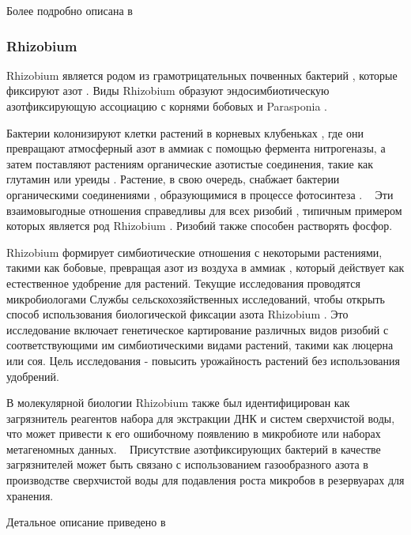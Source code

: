 \documentclass[11pt]{article}
\begin{document}
	Более подробно описана в ~\cite{Pasteurella_1,Pasteurella_2,Pasteurella_3,Pasteurella_4,Pasteurella_5,Pasteurella_6,Pasteurella_7,Pasteurella_8,Pasteurella_9,Pasteurella_10,Pasteurella_11,Pasteurella_12,Pasteurella_13,Pasteurella_14,Pasteurella_15,Pasteurella_16}
	
	\subsubsection{Rhizobium}
	Rhizobium является родом из грамотрицательных почвенных бактерий , которые фиксируют азот . Виды Rhizobium образуют эндосимбиотическую азотфиксирующую ассоциацию с корнями бобовых и Parasponia .
	
	Бактерии колонизируют клетки растений в корневых клубеньках , где они превращают атмосферный азот в аммиак с помощью фермента нитрогеназы, а затем поставляют растениям органические азотистые соединения, такие как глутамин или уреиды . Растение, в свою очередь, снабжает бактерии органическими соединениями , образующимися в процессе фотосинтеза . ~\cite{Rhizobium_2} Эти взаимовыгодные отношения справедливы для всех ризобий , типичным примером которых является род Rhizobium . Ризобий также способен растворять фосфор. ~\cite{Rhizobium_3}
	
	Rhizobium формирует симбиотические отношения с некоторыми растениями, такими как бобовые, превращая азот из воздуха в аммиак , который действует как естественное удобрение для растений. Текущие исследования проводятся микробиологами Службы сельскохозяйственных исследований, чтобы открыть способ использования биологической фиксации азота Rhizobium . Это исследование включает генетическое картирование различных видов ризобий с соответствующими им симбиотическими видами растений, такими как люцерна или соя. Цель исследования - повысить урожайность растений без использования удобрений.~\cite{Rhizobium_5}
	
	В молекулярной биологии Rhizobium также был идентифицирован как загрязнитель реагентов набора для экстракции ДНК и систем сверхчистой воды, что может привести к его ошибочному появлению в микробиоте или наборах метагеномных данных. ~\cite{Rhizobium_6} Присутствие азотфиксирующих бактерий в качестве загрязнителей может быть связано с использованием газообразного азота в производстве сверхчистой воды для подавления роста микробов в резервуарах для хранения. ~\cite{Rhizobium_7}
	
	Детальное описание приведено в ~\cite{Rhizobium_1,Rhizobium_2,Rhizobium_3,Rhizobium_4,Rhizobium_5,Rhizobium_6,Rhizobium_7,Rhizobium_8,Rhizobium_9,Rhizobium_10,Rhizobium_11,Rhizobium_12,Rhizobium_13,Rhizobium_14,Rhizobium_15,Rhizobium_16,Rhizobium_17,Rhizobium_18}
	
\end{document}

